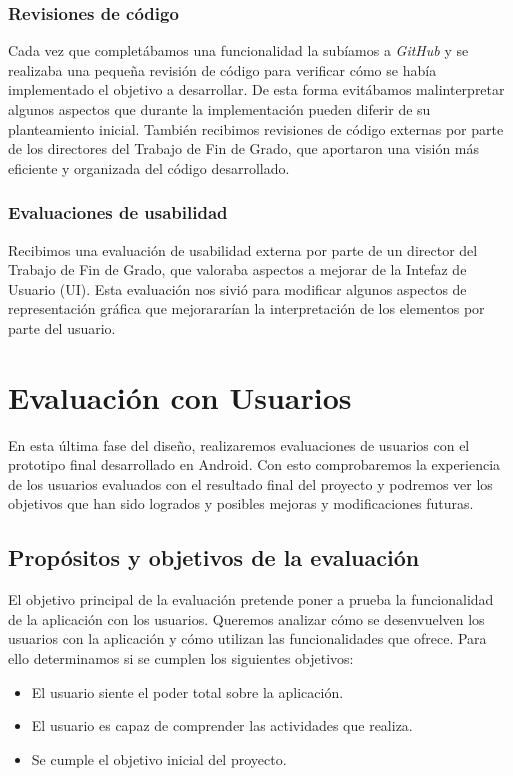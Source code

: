 \subsubsection{Revisiones de código}

Cada vez que completábamos una funcionalidad la subíamos a \textit{GitHub} y se realizaba una pequeña revisión de código para verificar cómo se había implementado el objetivo a desarrollar. De esta forma evitábamos malinterpretar algunos aspectos que durante la implementación pueden diferir de su planteamiento inicial. También recibimos revisiones de código externas por parte de los directores del Trabajo de Fin de Grado, que aportaron una visión más eficiente y organizada del código desarrollado.

\subsubsection{Evaluaciones de usabilidad}

Recibimos una evaluación de usabilidad externa por parte de un director del Trabajo de Fin de Grado, que valoraba aspectos a mejorar de la Intefaz de Usuario (UI). Esta evaluación nos sivió para modificar algunos aspectos de representación gráfica que mejorararían la interpretación de los elementos por parte del usuario.

\section{Evaluación con Usuarios}

En esta última fase del diseño, realizaremos evaluaciones de usuarios con el prototipo final desarrollado en Android. Con esto comprobaremos la experiencia de los usuarios evaluados con el resultado final del proyecto y podremos ver los objetivos que han sido logrados y posibles mejoras y modificaciones futuras.

\subsection{Propósitos y objetivos de la evaluación}

El objetivo principal de la evaluación pretende poner a prueba la funcionalidad de la aplicación con los usuarios. Queremos analizar cómo se desenvuelven los usuarios con la aplicación y cómo utilizan las funcionalidades que ofrece. Para ello determinamos si se cumplen los siguientes objetivos:

\begin{itemize}
 \item El usuario siente el poder total sobre la aplicación.
 \item El usuario es capaz de comprender las actividades que realiza.
 \item Se cumple el objetivo inicial del proyecto. 
\end{itemize}

